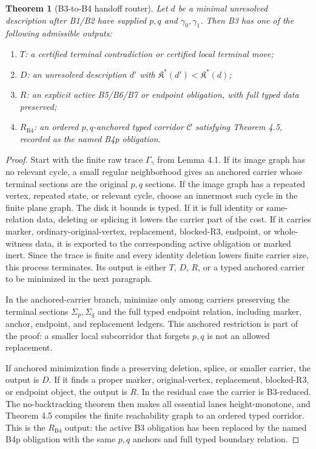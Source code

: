 \documentclass[11pt]{amsart}
\newtheorem{theorem}{Theorem}[section]
\theoremstyle{definition}
\begin{document}
\begin{theorem}[B3-to-B4 handoff router]
Let \(d\) be a minimal unresolved description after B1/B2 have supplied \(p,q\) and \(\gamma_0,\gamma_1\). Then B3 has one of the following admissible outputs:

\begin{enumerate}
\item \(T\): a certified terminal contradiction or certified local terminal move;
\item \(D\): an unresolved description \(d'\) with \(\mathfrak K^\ast(d')<\mathfrak K^\ast(d)\);
\item \(R\): an explicit active B5/B6/B7 or endpoint obligation, with full typed data preserved;
\item \(R_{\mathrm{B4}}\): an ordered \(p,q\)-anchored typed corridor \(\mathcal C\) satisfying Theorem 4.5, recorded as the named B4p obligation.
\end{enumerate}

\end{theorem}
\begin{proof}
Start with the finite raw trace \(\Gamma_\gamma\) from Lemma 4.1. If its image graph has no relevant cycle, a small regular neighborhood gives an anchored carrier whose terminal sections are the original \(p,q\) sections. If the image graph has a repeated vertex, repeated state, or relevant cycle, choose an innermost such cycle in the finite plane graph. The disk it bounds is typed. If it is full identity or same-relation data, deleting or splicing it lowers the carrier part of the cost. If it carries marker, ordinary-original-vertex, replacement, blocked-R3, endpoint, or whole-witness data, it is exported to the corresponding active obligation or marked inert. Since the trace is finite and every identity deletion lowers finite carrier size, this process terminates. Its output is either \(T\), \(D\), \(R\), or a typed anchored carrier to be minimized in the next paragraph.

In the anchored-carrier branch, minimize only among carriers preserving the terminal sections \(\Sigma_p,\Sigma_q\) and the full typed endpoint relation, including marker, anchor, endpoint, and replacement ledgers. This anchored restriction is part of the proof: a smaller local subcorridor that forgets \(p,q\) is not an allowed replacement.

If anchored minimization finds a preserving deletion, splice, or smaller carrier, the output is \(D\). If it finds a proper marker, original-vertex, replacement, blocked-R3, or endpoint object, the output is \(R\). In the residual case the carrier is B3-reduced. The no-backtracking theorem then makes all essential lanes height-monotone, and Theorem 4.5 compiles the finite reachability graph to an ordered typed corridor. This is the \(R_{\mathrm{B4}}\) output: the active B3 obligation has been replaced by the named B4p obligation with the same \(p,q\) anchors and full typed boundary relation.

\end{proof}
\end{document}
